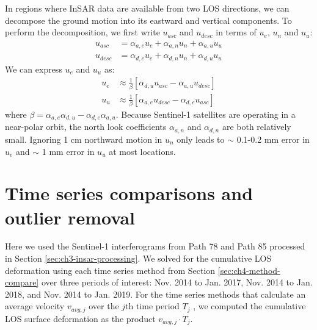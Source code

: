 In regions where InSAR data are available from two LOS directions, we can decompose the ground motion into its eastward and vertical components.
To perform the decomposition, we first write $u_{asc}$ and $u_{desc}$ in terms of $u_e$, $u_n$ and $u_u$:
\begin{align}
	u_{asc} &= \alpha_{a,e} u_{e} + \alpha_{a,n} u_{n} + \alpha_{a,u} u_{u}\\
	u_{desc} &= \alpha_{d,e} u_{e} + \alpha_{d,n} u_{n} + \alpha_{d,u} u_{u}
\end{align}
We can express $u_e$ and $u_u$ as:
\begin{align}
	u_{e} &\approx  \frac{1}{\beta}  \left[\alpha_{d,u}  u_{asc} - \alpha_{a,u} u_{desc} \right] \\
	u_{u} &\approx  \frac{1}{\beta}  \left[\alpha_{a,e} u_{desc} - \alpha_{d,e}  u_{asc}  \right] 
\end{align}
where  $ \beta = {\alpha_{a,e} \alpha_{d,u}- \alpha_{d,e} \alpha_{a,u}} $.
Because Sentinel-1 satellites are operating in a near-polar orbit, the north look coefficients $\alpha_{a,n}$ and $\alpha_{d,n}$ are both relatively small. Ignoring 1 cm northward motion in $u_n$ only leads to $\sim$ 0.1-0.2 mm error in $u_e$ and $\sim$ 1 mm error in $u_u$ at most locations.  



\section{Time series comparisons and outlier removal}
\label{sec:ch4-ts-compare-result}



Here we used the Sentinel-1 interferograms from Path 78 and Path 85 processed in Section \ref{sec:ch3-insar-processing}. 
We solved for the cumulative LOS deformation using each time series method from Section \ref{sec:ch4-method-compare} over three periods of interest: Nov. 2014 to Jan. 2017, Nov. 2014 to Jan. 2018, and Nov. 2014 to Jan. 2019. 
For the time series methods that calculate an average velocity $v_{avg,j}$ over the $j$th time period $T_j$ , we computed the cumulative LOS surface deformation as the product $v_{avg,j} \cdot T_j$.

